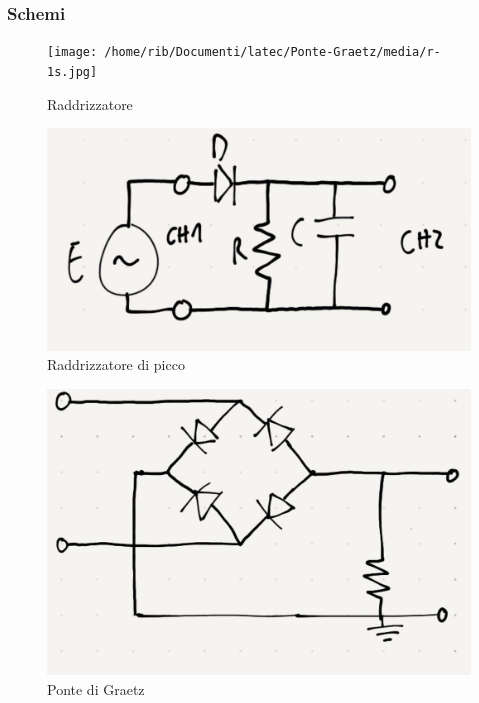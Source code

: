 \documentclass[12pt]{article}
\begin{document}
    \subsubsection{Schemi}
    \begin{figure}[H]
        \centering
        \texttt{[image: /home/rib/Documenti/latec/Ponte-Graetz/media/r-1s.jpg]}          
        \caption{Raddrizzatore}
    \end{figure}
    \begin{figure}[H]
        \centering
        \includegraphics[scale=0.1]{media/rl-1s.jpg}            
        \caption{Raddrizzatore di picco}
    \end{figure}
    \begin{figure}[H]
        \centering
        \includegraphics[scale=0.1]{media/pg-schema.jpg}            
        \caption{Ponte di Graetz}
    \end{figure}
\end{document}
